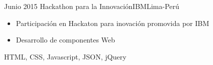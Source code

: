 \begin{experiences}
  \emptySeparator
  \experience
    {Junio 2015} {Hackathon para la Innovación}{IBM}{Lima-Perú}
    {}    {
                      \begin{itemize}
                        \item Participación en Hackaton para inovación promovida por IBM 
                        \item Desarrollo de componentes Web                                                           
                      \end{itemize}
                    }
                    {HTML, CSS, Javascript, JSON, jQuery}
                    
  \emptySeparator
  
  
\end{experiences}
